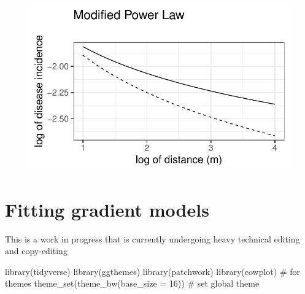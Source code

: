 \documentclass[
  letterpaper,
  DIV=11,
  numbers=noendperiod]{scrreprt}
\newenvironment{Shaded}{\begin{snugshade}}{\end{snugshade}}
\newcommand{\AttributeTok}[1]{\textcolor[rgb]{0.40,0.45,0.13}{#1}}
\newcommand{\CommentTok}[1]{\textcolor[rgb]{0.37,0.37,0.37}{#1}}
\newcommand{\DecValTok}[1]{\textcolor[rgb]{0.68,0.00,0.00}{#1}}
\newcommand{\FunctionTok}[1]{\textcolor[rgb]{0.28,0.35,0.67}{#1}}
\newcommand{\NormalTok}[1]{\textcolor[rgb]{0.00,0.23,0.31}{#1}}
\begin{document}
\begin{figure}[H]

{\centering \includegraphics{./spatial-models_files/figure-pdf/unnamed-chunk-12-1.pdf}

}

\end{figure}

\hypertarget{fitting-gradient-models}{%
\chapter{Fitting gradient models}\label{fitting-gradient-models}}

\begin{tcolorbox}[enhanced jigsaw, rightrule=.15mm, left=2mm, breakable, colframe=quarto-callout-note-color-frame, toprule=.15mm, leftrule=.75mm, bottomrule=.15mm, colback=white, arc=.35mm, opacityback=0]
\begin{minipage}[t]{5.5mm}
\textcolor{quarto-callout-note-color}{\faInfo}
\end{minipage}%
\begin{minipage}[t]{\textwidth - 5.5mm}
This is a work in progress that is currently undergoing heavy technical
editing and copy-editing\end{minipage}%
\end{tcolorbox}

\begin{Shaded}
\begin{Highlighting}[]
\FunctionTok{library}\NormalTok{(tidyverse)}
\FunctionTok{library}\NormalTok{(ggthemes)}
\FunctionTok{library}\NormalTok{(patchwork)}
\FunctionTok{library}\NormalTok{(cowplot) }\CommentTok{\# for themes }
\FunctionTok{theme\_set}\NormalTok{(}\FunctionTok{theme\_bw}\NormalTok{(}\AttributeTok{base\_size =} \DecValTok{16}\NormalTok{)) }\CommentTok{\# set global theme}
\end{Highlighting}
\end{Shaded}
\end{document}

